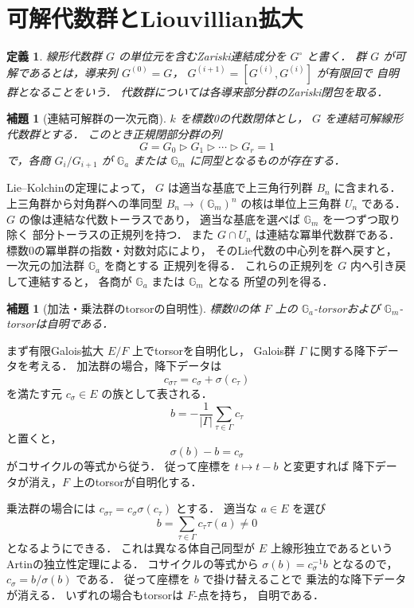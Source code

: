 \documentclass[a5paper,10pt,onecolumn]{jsarticle}
\makeatletter
\theoremstyle{mathnotetheorem}
\newtheorem{definition}[theorem]{定義}
\newtheorem{lemma}[theorem]{補題}
\renewcommand{\proofname}{証明}
\renewenvironment{proof}[1][\proofname]{%
  \par\pushQED{\qed}\normalfont\topsep4\p@\@plus2\p@\relax
  \trivlist\item[\hskip\labelsep\bfseries #1]\ignorespaces
}{\popQED\endtrivlist\@endpefalse}
\makeatother
\begin{document}
\section{可解代数群とLiouvillian拡大}

\begin{definition}
線形代数群 $G$ の単位元を含むZariski連結成分を
$G^\circ$ と書く．
群 $G$ が可解であるとは，導来列
$G^{(0)}=G$，
$G^{(i+1)}=[G^{(i)},G^{(i)}]$ が有限回で
自明群となることをいう．
代数群については各導来部分群のZariski閉包を取る．
\end{definition}

\begin{lemma}[連結可解群の一次元商]\label{lem:solvable-series}
$k$ を標数0の代数閉体とし，
$G$ を連結可解線形代数群とする．
このとき正規閉部分群の列
\[
 G=G_0\triangleright G_1\triangleright\cdots
 \triangleright G_r=1
\]
で，各商 $G_i/G_{i+1}$ が
$\mathbb G_a$ または $\mathbb G_m$ に同型となるものが存在する．
\end{lemma}
\begin{proof}
Lie--Kolchinの定理によって，
$G$ は適当な基底で上三角行列群 $B_n$ に含まれる．
上三角群から対角群への準同型
$B_n\to(\mathbb G_m)^n$ の核は単位上三角群 $U_n$ である．
$G$ の像は連結な代数トーラスであり，
適当な基底を選べば
$\mathbb G_m$ を一つずつ取り除く
部分トーラスの正規列を持つ．
また $G\cap U_n$ は連結な冪単代数群である．
標数0の冪単群の指数・対数対応により，
そのLie代数の中心列を群へ戻すと，
一次元の加法群 $\mathbb G_a$ を商とする
正規列を得る．
これらの正規列を $G$ 内へ引き戻して連結すると，
各商が $\mathbb G_a$ または $\mathbb G_m$ となる
所望の列を得る．
\end{proof}

\begin{lemma}[加法・乗法群のtorsorの自明性]
\label{lem:hilbert90}
標数0の体 $F$ 上の $\mathbb G_a$-torsorおよび
$\mathbb G_m$-torsorは自明である．
\end{lemma}
\begin{proof}
まず有限Galois拡大 $E/F$ 上でtorsorを自明化し，
Galois群 $\Gamma$ に関する降下データを考える．
加法群の場合，降下データは
\[
 c_{\sigma\tau}=c_\sigma+\sigma(c_\tau)
\]
を満たす元 $c_\sigma\in E$ の族として表される．
\[
 b=-\frac1{|\Gamma|}\sum_{\tau\in\Gamma}c_\tau
\]
と置くと，
\[
 \sigma(b)-b=c_\sigma
\]
がコサイクルの等式から従う．
従って座標を $t\mapsto t-b$ と変更すれば
降下データが消え，$F$ 上のtorsorが自明化する．

乗法群の場合には
$c_{\sigma\tau}=c_\sigma\sigma(c_\tau)$ とする．
適当な $a\in E$ を選び
\[
 b=\sum_{\tau\in\Gamma}c_\tau\tau(a)\ne0
\]
となるようにできる．
これは異なる体自己同型が $E$ 上線形独立であるという
Artinの独立性定理による．
コサイクルの等式から
$\sigma(b)=c_\sigma^{-1}b$ となるので，
$c_\sigma=b/\sigma(b)$ である．
従って座標を $b$ で掛け替えることで
乗法的な降下データが消える．
いずれの場合もtorsorは $F$-点を持ち，
自明である．
\end{proof}
\end{document}

